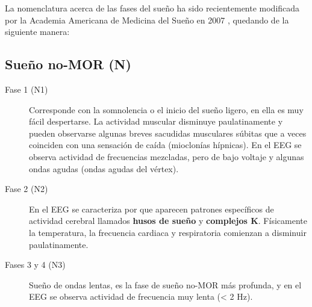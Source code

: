 
La nomenclatura acerca de las fases del sue\~no ha sido 
recientemente modificada por la Academia Americana de Medicina del Sueño en 2007 \cite{AASM07}, 
quedando de la siguiente manera:


\subsection{Sueño no-MOR (N)}

\begin{description}
\item[Fase 1 (N1)] Corresponde con la somnolencia o el inicio del sue\~no ligero, en ella es muy 
f\'acil despertarse. La actividad muscular disminuye paulatinamente y pueden observarse algunas 
breves sacudidas musculares s\'ubitas que a veces coinciden con una sensación de ca\'ida 
(mioclon\'ias h\'ipnicas). En el EEG se observa actividad de frecuencias mezcladas, pero de bajo 
voltaje y algunas ondas agudas (ondas agudas del v\'ertex). 

\item[Fase 2 (N2)] En el EEG se caracteriza por que aparecen patrones espec\'ificos de actividad 
cerebral llamados \textbf{husos de sue\~no} y \textbf{complejos K}. F\'isicamente la 
temperatura, la frecuencia cardiaca y respiratoria comienzan a disminuir paulatinamente. 

\item[Fases 3 y 4 (N3)] Sue\~no de ondas lentas, es la fase de sue\~no no-MOR m\'as profunda, 
y en el EEG se observa actividad de frecuencia muy lenta (< 2 Hz).
\end{description}

